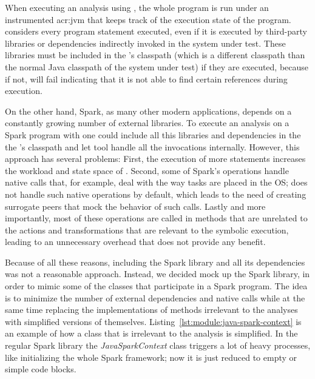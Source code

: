 
When executing an analysis using \jpf{}, the whole program is run under an instrumented \acrshort{acr:jvm} that keeps track of the execution state of the program. \jpf{} considers every program statement executed, even if it is executed by third-party libraries or dependencies indirectly invoked in the system under test. These libraries must be included in the \jpf{}'s classpath (which is a different classpath than the normal Java classpath of the system under test) if they are executed, because if not, \jpf{} will fail indicating that it is not able to find certain references during execution.

On the other hand, Spark, as many other modern applications, depends on a constantly growing number of external libraries. To execute an analysis on a Spark program with \jpf{} one could include all this libraries and dependencies in the the \jpf{}'s classpath and let tool handle all the invocations internally. However, this approach has several problems: First, the execution of more statements increases the workload and state space of \jpf{}. Second, some of Spark's operations handle native calls that, for example, deal with the way tasks are placed in the OS; \jpf{} does not handle such native operations by default, which leads to the need of creating surrogate peers that mock the behavior of such calls. Lastly and more importantly, most of these operations are called in methods that are unrelated to the actions and transformations that are relevant to the symbolic execution, leading to an unnecessary overhead that does not provide any benefit.

Because of all these reasons, including the Spark library and all its dependencies was not a reasonable approach. Instead, we decided mock up the Spark library, in order to mimic some of the classes that participate in a Spark program. The idea is to minimize the number of external dependencies and native calls while at the same time replacing the implementations of methods irrelevant to the analyses with simplified versions of themselves. Listing~\ref{lst:module:java-spark-context} is an example of how a class that is irrelevant to the analysis is simplified. In the regular Spark library the \textit{JavaSparkContext} class triggers a lot of heavy processes, like initializing the whole Spark framework; now it is just reduced to empty or simple code blocks.

